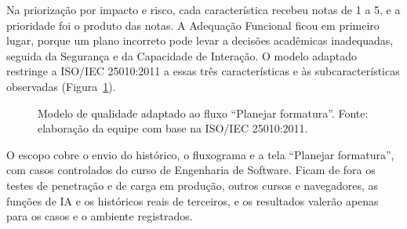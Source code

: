 \documentclass[12pt]{article}
\begin{document}
Na priorização por impacto e risco, cada característica recebeu notas de 1 a 5, e a
prioridade foi o produto das notas. A Adequação Funcional ficou em primeiro lugar,
porque um plano incorreto pode levar a decisões acadêmicas inadequadas, seguida da
Segurança e da Capacidade de Interação. O modelo adaptado restringe a ISO/IEC 25010:2011 a essas
três características e às subcaracterísticas observadas (Figura~\ref{fig:modelo}).

\begin{figure}[!ht]
\centering
{}
\caption{Modelo de qualidade adaptado ao fluxo ``Planejar formatura''. Fonte:
elaboração da equipe com base na ISO/IEC 25010:2011.}
\label{fig:modelo}
\end{figure}

O escopo cobre o envio do histórico, o fluxograma e a tela ``Planejar formatura'',
com casos controlados do curso de Engenharia de Software. Ficam de fora os testes de
penetração e de carga em produção, outros cursos e navegadores, as funções de IA e os
históricos reais de terceiros, e os resultados valerão apenas para os casos e o
ambiente registrados.
\end{document}
